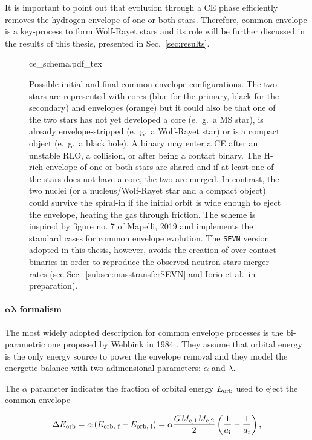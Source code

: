 \documentclass[a4paper,titlepage]{book}     	%
\begin{document}
It is important to point out that evolution through a CE phase efficiently removes the hydrogen envelope of one or both stars. Therefore, common envelope is a key-process to form Wolf-Rayet stars and its role will be further discussed in the results of this thesis, presented in Sec.\ \ref{sec:results}.


\begin{figure}
	\centering
	\def\svgwidth{0.9\textwidth}
	{ce_schema.pdf_tex} 
	\caption{Possible initial and final common envelope configurations. The two stars are represented with cores (blue for the primary, black for the secondary) and envelopes (orange) but it could also be that one of the two stars has not yet developed a core (e.\ g.\ a MS star), is already envelope-stripped (e.\ g.\ a Wolf-Rayet star) or is a compact object (e.\ g.\ a black hole). A binary may enter a CE after an unstable RLO, a collision, or after being a contact binary. The H-rich envelope of one or both stars are shared and if at least one of the stars %
	does not have a core, the two are merged. In contrast, the two nuclei (or a nucleus/Wolf-Rayet  star and a compact object) could survive the spiral-in if the initial orbit is wide enough to eject the envelope, heating the gas through friction. The scheme is inspired by figure no. 7 of Mapelli, 2019 \cite{mapelli} and implements the standard cases for common envelope evolution. The \texttt{SEVN} version adopted in this thesis, however, avoids the creation of over-contact binaries in order to reproduce the observed neutron stars merger rates (see Sec.\ \ref{subsec:masstransferSEVN} and Iorio et al.\ in preparation).}\label{fig:ce_mapelli}
\end{figure}


\paragraph{$\boldsymbol{\alpha \lambda}$ formalism} The most widely adopted description for common envelope processes is the bi-parametric one proposed by Webbink in 1984 \cite{Webbink1984_CE}. They assume that orbital energy is the only energy source to power the envelope removal and they model the energetic balance with two adimensional parameters: $\alpha$ and $\lambda$.

The $\alpha$ parameter indicates the fraction of orbital energy  $E_{\rm orb}$ used to eject the common envelope

\begin{equation}\label{eq:EorbCEalpha}
\Delta E_\textup{orb} = \alpha \left(E_\textup{orb, f} - E_\textup{orb, i}\right) = \alpha \frac{G M_\textup{c,1} M_\textup{c,2}}{2} \left(\frac{1}{a_\textup{i}} - \frac{1}{a_\textup{f}}\right),
\end{equation}
\end{document}
